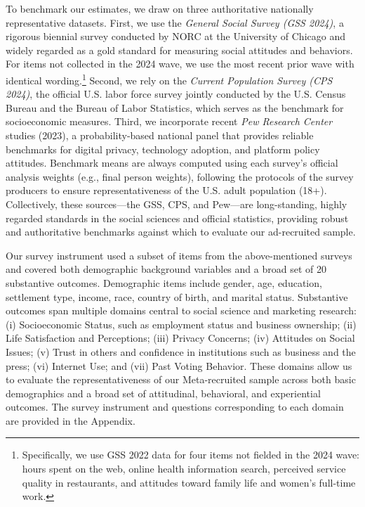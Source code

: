 To benchmark our estimates, we draw on three authoritative nationally representative datasets. First, we use the \textit{General Social Survey (GSS 2024)}, a rigorous biennial survey conducted by NORC at the University of Chicago and widely regarded as a gold standard for measuring social attitudes and behaviors. For items not collected in the 2024 wave, we use the most recent prior wave with identical wording.\footnote{Specifically, we use GSS 2022 data for four items not fielded in the 2024 wave: hours spent on the web, online health information search, perceived service quality in restaurants, and attitudes toward family life and women’s full-time work.}
 Second, we rely on the \textit{Current Population Survey (CPS 2024)}, the official U.S. labor force survey jointly conducted by the U.S. Census Bureau and the Bureau of Labor Statistics, which serves as the benchmark for socioeconomic measures. Third, we incorporate recent \textit{Pew Research Center} studies (2023), a probability-based national panel that provides reliable benchmarks for digital privacy, technology adoption, and platform policy attitudes. Benchmark means are always computed using each survey’s official analysis weights (e.g., final person weights), following the protocols of the survey producers to ensure representativeness of the U.S. adult population (18+). Collectively, these sources—the GSS, CPS, and Pew—are long-standing, highly regarded standards in the social sciences and official statistics, providing robust and authoritative benchmarks against which to evaluate our ad-recruited sample.

Our survey instrument used a subset of items from the above-mentioned surveys and covered both demographic background variables and a broad set of 20 substantive outcomes. Demographic items include gender, age, education, settlement type, income, race, country of birth, and marital status. Substantive outcomes span multiple domains central to social science and marketing research: (i) Socioeconomic Status, such as employment status and business ownership; (ii) Life Satisfaction and Perceptions; (iii) Privacy Concerns; (iv) Attitudes on Social Issues; (v) Trust in others and confidence in institutions such as business and the press; (vi) Internet Use; and (vii) Past Voting Behavior. These domains allow us to evaluate the representativeness of our Meta-recruited sample across both basic demographics and a broad set of attitudinal, behavioral, and experiential outcomes. The survey instrument and questions corresponding to each domain are provided in the Appendix.


